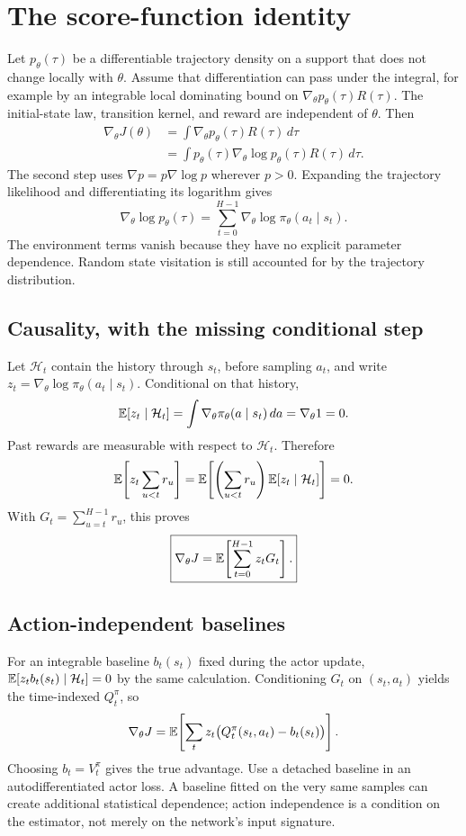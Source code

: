 


\section{The score-function identity}
Let $p_\theta(\tau)$ be a differentiable trajectory density on a support that
does not change locally with $\theta$. Assume that differentiation can pass
under the integral, for example by an integrable local dominating bound on
$\nabla_\theta p_\theta(\tau)R(\tau)$. The initial-state law, transition kernel,
and reward are independent of $\theta$. Then
\begin{align*}
 \nabla_\theta J(\theta)
 &=\int\nabla_\theta p_\theta(\tau)R(\tau)\,d\tau\\
 &=\int p_\theta(\tau)\nabla_\theta\log p_\theta(\tau)R(\tau)\,d\tau.
\end{align*}
The second step uses $\nabla p=p\nabla\log p$ wherever $p>0$.
Expanding the trajectory likelihood and differentiating its logarithm gives
\[
 \nabla_\theta\log p_\theta(\tau)
 =\sum_{t=0}^{H-1}\nabla_\theta\log\pi_\theta(a_t\mid s_t).
\]
The environment terms vanish because they have no explicit parameter dependence.
Random state visitation is still accounted for by the trajectory distribution.

\subsection{Causality, with the missing conditional step}
Let $\mathcal H_t$ contain the history through $s_t$, before sampling $a_t$,
and write $z_t=\nabla_\theta\log\pi_\theta(a_t\mid s_t)$. Conditional on that history,
\[
 \mathbb{E}[z_t\mid\mathcal H_t]
 =\int\nabla_\theta\pi_\theta(a\mid s_t)\,da
 =\nabla_\theta1=0.
\]
Past rewards are measurable with respect to $\mathcal H_t$. Therefore
\[
 \mathbb{E}\!\left[z_t\sum_{u<t}r_u\right]
 =\mathbb{E}\!\left[\left(\sum_{u<t}r_u\right)
                   \mathbb{E}[z_t\mid\mathcal H_t]\right]=0.
\]
With $G_t=\sum_{u=t}^{H-1}r_u$, this proves
\[
 \boxed{\nabla_\theta J=\mathbb{E}\!\left[\sum_{t=0}^{H-1}z_tG_t\right].}
\]

\subsection{Action-independent baselines}
For an integrable baseline $b_t(s_t)$ fixed during the actor update,
$\mathbb{E}[z_tb_t(s_t)\mid\mathcal H_t]=0$ by the same calculation. Conditioning
$G_t$ on $(s_t,a_t)$ yields the time-indexed $Q_t^\pi$, so
\[
 \nabla_\theta J=\mathbb{E}\!\left[\sum_tz_t\big(Q_t^\pi(s_t,a_t)-b_t(s_t)\big)\right].
\]
Choosing $b_t=V_t^\pi$ gives the true advantage. Use a detached baseline in
an autodifferentiated actor loss. A baseline fitted on the very same samples
can create additional statistical dependence; action independence is a
condition on the estimator, not merely on the network's input signature.

